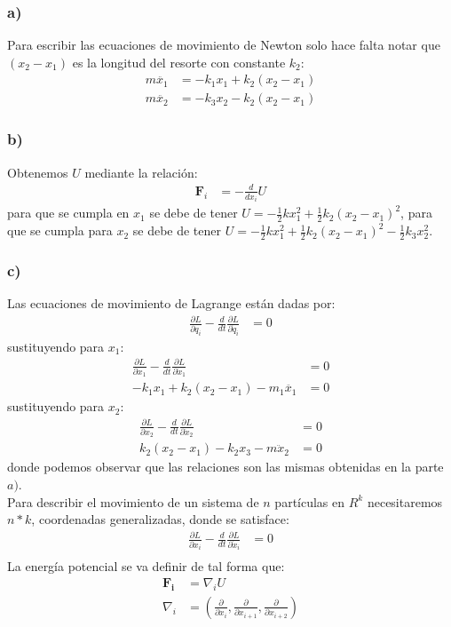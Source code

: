 \documentclass{article}
\begin{document}
\begin{tcolorbox}[breakable]
    \subsubsection*{a)}
    Para escribir las ecuaciones de movimiento de Newton solo hace falta notar que 
    $(x_2-x_1)$ es la longitud del resorte con constante $k_2$:
    \begin{align*}
        m\ddot{x_1} &= -k_1x_1 + k_2(x_2-x_1) \\
        m\ddot{x_2} &= -k_3x_2 - k_2(x_2-x_1)
    \end{align*}
    \subsubsection*{b)}
    Obtenemos $U$ mediante la relación:
    \begin{align*}
        \bm{F}_i &= -\frac{d}{dx_i}U
    \end{align*}
    para que se cumpla en $x_1$ se debe de tener $U = -\frac{1}{2}kx_1^2+\frac{1}{2}k_2(x_2-x_1)^2$, para 
    que se cumpla para $x_2$ se debe de tener $U = -\frac{1}{2}kx_1^2+\frac{1}{2}k_2(x_2-x_1)^2-\frac{1}{2}k_3x_2^2$.
    \subsubsection*{c)}
    Las ecuaciones de movimiento de Lagrange están dadas por:
    \begin{align*}
        \frac{\partial L}{\partial q_i} - \frac{d}{dt}\frac{\partial L }{\partial \dot{q}_i} &= 0 
    \end{align*}
    sustituyendo para $x_1$:
    \begin{align*}
        \frac{\partial L}{\partial x_1} - \frac{d}{dt}\frac{\partial L }{\partial \dot{x}_1} &= 0 \\
        -k_1x_1+k_2(x_2-x_1) - m_1\ddot{x_1} &= 0  
    \end{align*}
    sustituyendo para $x_2$:
    \begin{align*}
        \frac{\partial L}{\partial x_2} - \frac{d}{dt}\frac{\partial L }{\partial \dot{x}_2} &= 0 \\
        k_2(x_2-x_1)-k_2x_3 - m\ddot{x}_2 &= 0 
    \end{align*}
    donde podemos observar que las relaciones son las mismas obtenidas en la parte $a)$. \\
    Para describir el movimiento de un sistema de $n$ partículas en $R^k$ necesitaremos $n*k$, 
    coordenadas generalizadas, donde se satisface:
    \begin{align*}
        \frac{\partial L}{\partial x_i} - \frac{d}{dt}\frac{\partial L }{\partial \dot{x}_i} &= 0 \\
    \end{align*}
    La energía potencial se va definir de tal forma que:
    \begin{align*}
        \bm{F_i} &= \nabla_i U \\
        \nabla_i &= \left( \frac{\partial }{\partial x_i}, \frac{\partial }{\partial x_{i+1}}, \frac{\partial }{\partial x_{i+2}} \right)
    \end{align*}
    
\end{tcolorbox}
\end{document}
